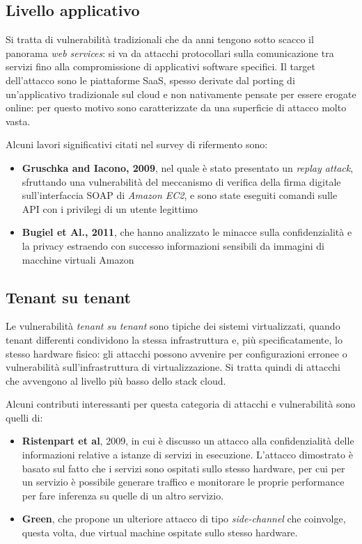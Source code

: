 \documentclass[../main.tex]{subfiles}
\begin{document}
\subsection{Livello applicativo}
Si tratta di vulnerabilità tradizionali che da anni tengono sotto scacco il panorama \textit{web services}: si va da attacchi protocollari sulla comunicazione tra servizi fino alla compromissione di applicativi software specifici. Il target dell'attacco sono le piattaforme SaaS, spesso derivate dal porting di un'applicativo tradizionale sul cloud e non nativamente pensate per essere erogate online: per questo motivo sono caratterizzate da una superficie di attacco molto vasta.

Alcuni lavori significativi citati nel survey di rifermento \cite{Ardagna:2015:SAC:2808687.2767005} sono:
\begin{itemize}
    \item \textbf{Gruschka and Iacono, 2009}\cite{Ieee5175877}, nel quale è stato presentato un \textit{replay attack}, sfruttando una vulnerabilità del meccanismo di verifica della firma digitale sull'interfaccia SOAP di \textit{Amazon EC2}, e sono state eseguiti comandi sulle API con i privilegi di un utente legittimo
    \item \textbf{Bugiel et Al., 2011}\cite{Bugiel:2011:AES:2046707.2046753}, che hanno analizzato le minacce sulla confidenzialità e la privacy estraendo con successo informazioni sensibili da immagini di macchine virtuali Amazon 
\end{itemize} 

\subsection{Tenant su tenant}
Le vulnerabilità \textit{tenant su tenant} sono tipiche dei sistemi virtualizzati, quando tenant differenti condividono la stessa infrastruttura e, più specificatamente, lo stesso hardware fisico: gli attacchi possono avvenire per configurazioni erronee o vulnerabilità sull'infrastruttura di virtualizzazione. Si tratta quindi di attacchi che avvengono al livello più basso dello stack cloud\cite{Ardagna:2015:SAC:2808687.2767005}.

Alcuni contributi interessanti per questa categoria di attacchi e vulnerabilità sono quelli di:

\begin{itemize}
    \item \textbf{Ristenpart et al}, 2009\cite{Ristenpart:2009:HYG:1653662.1653687}, in cui è discusso un attacco alla confidenzialità delle informazioni relative a istanze di servizi in esecuzione. L'attacco dimostrato è basato sul fatto che i servizi sono ospitati sullo stesso hardware, per cui per un servizio è possibile generare traffico e monitorare le proprie performance per fare inferenza su quelle di un altro servizio.
	\item \textbf{Green}\cite{Ieee6427814}, che propone un ulteriore attacco di tipo \textit{side-channel} che coinvolge, questa volta, due virtual machine ospitate sullo stesso hardware.
\end{itemize}
\end{document}
